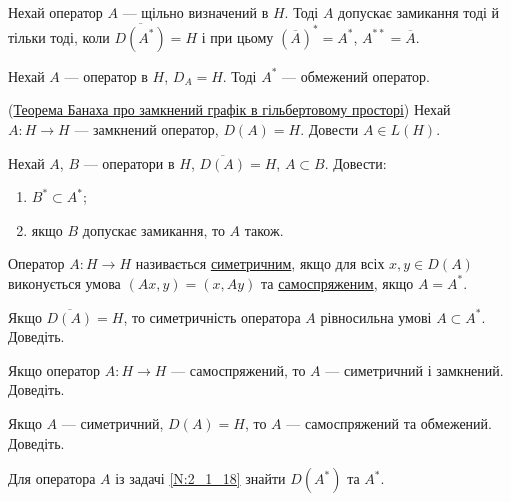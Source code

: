 \begin{exercise}
    Нехай оператор $A$ --- щільно визначений в $H$. Тоді $A$ допускає замикання тоді 
    й тільки тоді, коли $\overline{D(A^*)} = H$ і при цьому $(\overline{A})^* = A^*$, $A^{**} = \overline{A}$.
\end{exercise}

\begin{exercise}
    Нехай $A$ --- оператор в $H$, $D_A = H$. Тоді $A^*$ --- обмежений оператор.
\end{exercise}

\begin{exercise}(\ul{Теорема Банаха про замкнений графік в гільбертовому просторі})
    Нехай $A: H \to H$ --- замкнений оператор, $D(A) = H$. Довести $A \in L(H)$.
\end{exercise}

\begin{exercise}
    Нехай $A$, $B$ --- оператори в $H$, $\overline{D(A)} = H$, $A \subset B$.
    Довести:
    \begin{enumerate}
        \item $B^* \subset A^*$;
        \item якщо $B$ допускає замикання, то $A$ також.
    \end{enumerate}
\end{exercise}

\begin{theory}
    Оператор $A: H \to H$ називається \ul{симетричним}, якщо для всіх $x,y \in D(A)$
    виконується умова $(Ax,y) = (x, Ay)$ та \ul{самоспряженим}, якщо $A = A^*$.
\end{theory}

\begin{exercise}
    Якщо $\overline{D(A)} = H$, то симетричність оператора $A$ рівносильна умові
    $A \subset A^*$. Доведіть.
\end{exercise}

\begin{exercise}
    Якщо оператор $A: H \to H$ --- самоспряжений, то $A$ --- симетричний і замкнений. Доведіть.
\end{exercise}

\begin{exercise}
    Якщо $A$ --- симетричний, $D(A) = H$, то $A$ --- самоспряжений та обмежений. Доведіть.
\end{exercise}

\begin{exercise}
    Для оператора $A$ із задачі \ref{N:2_1_18} знайти $D(A^*)$ та $A^*$.
\end{exercise}

